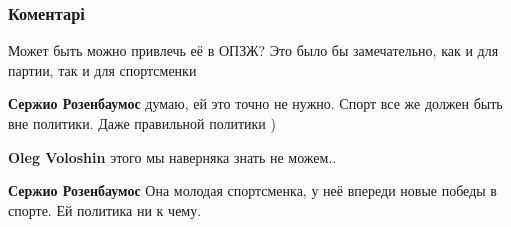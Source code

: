  
 
 
 
 
\subsubsection{Коментарі}
\label{sec:09_08_2021.fb.voloshin_oleg.opzzh.1.maguchih.cmt}

\begin{itemize}
 
Может быть можно привлечь её в ОПЗЖ? Это было бы замечательно, как и для партии, так и для спортсменки

\begin{itemize}
 
\textbf{Сержио Розенбаумос} думаю, ей это точно не нужно. Спорт все же должен быть вне политики. Даже правильной политики )

 
\textbf{Oleg Voloshin} этого мы наверняка знать не можем..

 
\textbf{Сержио Розенбаумос} Она молодая спортсменка, у неё впереди новые победы в спорте. Ей политика ни к чему.


\end{itemize}
\end{itemize}
